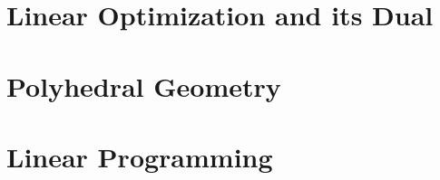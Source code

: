 \documentclass[12pt]{report}
\begin{document}
\chapter{Linear Optimization and its Dual}\label{chapter: lin opt dual}


\chapter{Polyhedral Geometry}\label{chapter: polyhedral geometry}


\chapter{Linear Programming}\label{chapter: linear programming}


%



\end{document}
